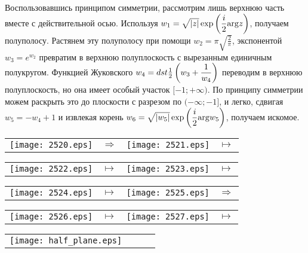 Воспользовавшись принципом симметрии, рассмотрим лишь верхнюю часть вместе с
действительной осью. Используя $w_1 = \sqrt{\left| z \right|}\exp \left(\displaystyle
    \frac{i}{2}\mathrm{arg} z\right)$, получаем полуполосу. Растянем эту полуполосу при
помощи $w_2 = \pi\sqrt{\frac{2}{\pi}}$, экспонентой $w_3 = e^{w_2}$ превратим в
верхнюю полуплоскость с вырезанным единичным полукругом. Функцией Жуковского
$w_4 = dst \frac{1}{2}\left( w_3+\displaystyle\frac{1}{w_4} \right)$ переводим в верхнюю
полуплоскость, но она имеет особый участок $[-1;+\infty)$. По принципу симметрии
можем раскрыть это до плоскости с разрезом по $(-\infty;-1]$, и легко, сдвигая
$w_5 = -w_4+1$ и извлекая корень $w_6 = \sqrt{\left| w_5 \right|}\exp \left(\displaystyle
    \frac{i}{2}\mathrm{arg} w_5\right)$, получаем искомое.
\begin{center}
    \begin{tabular}{cccc}
      \texttt{[image: 2520.eps]} & $\Rightarrow$ & \texttt{[image: 2521.eps]} & $\mapsto$ \\
    \end{tabular}
\end{center}
\begin{center}
    \begin{tabular}{cccc}
      \texttt{[image: 2522.eps]} & $\mapsto$ & \texttt{[image: 2523.eps]} & $\mapsto$ \\
    \end{tabular}
\end{center}
\begin{center}
    \begin{tabular}{cccc}
      \texttt{[image: 2524.eps]} & $\mapsto$ & \texttt{[image: 2525.eps]} & $\Rightarrow$ \\
    \end{tabular}
\end{center}
\begin{center}
    \begin{tabular}{cccc}
      \texttt{[image: 2526.eps]} & $\mapsto$ & \texttt{[image: 2527.eps]} & $\mapsto$ \\
    \end{tabular}
\end{center}
\begin{center}
    \begin{tabular}{cccc}
      \texttt{[image: half\_plane.eps]} & & & \\
    \end{tabular}
\end{center}
